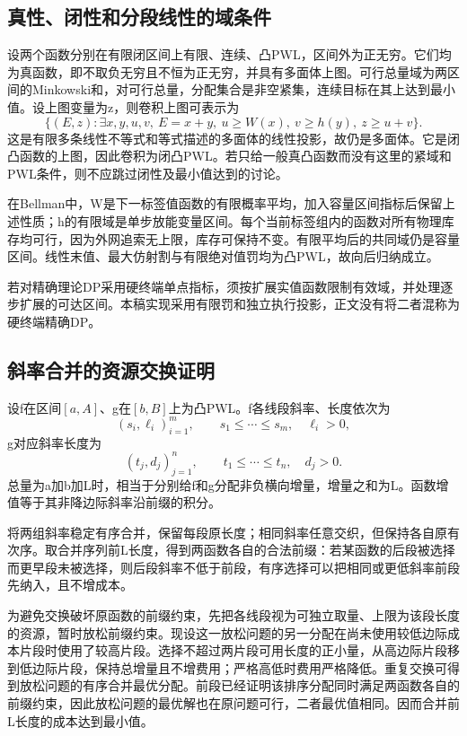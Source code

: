 \subsection{真性、闭性和分段线性的域条件}
设两个函数分别在有限闭区间上有限、连续、凸PWL，区间外为正无穷。它们均为真函数，即不取负无穷且不恒为正无穷，并具有多面体上图。可行总量域为两区间的Minkowski和，对可行总量，分配集合是非空紧集，连续目标在其上达到最小值。设上图变量为z，则卷积上图可表示为
\begin{equation}
 \{(E,z):\exists x,y,u,v,\ E=x+y,\ u\ge W(x),\ v\ge h(y),\ z\ge u+v\}.
\end{equation}
这是有限多条线性不等式和等式描述的多面体的线性投影，故仍是多面体。它是闭凸函数的上图，因此卷积为闭凸PWL。若只给一般真凸函数而没有这里的紧域和PWL条件，则不应跳过闭性及最小值达到的讨论。

在Bellman中，W是下一标签值函数的有限概率平均，加入容量区间指标后保留上述性质；h的有限域是单步放能变量区间。每个当前标签组内的函数对所有物理库存均可行，因为外网追索无上限，库存可保持不变。有限平均后的共同域仍是容量区间。线性末值、最大仿射割与有限绝对值罚均为凸PWL，故向后归纳成立。

若对精确理论DP采用硬终端单点指标，须按扩展实值函数限制有效域，并处理逐步扩展的可达区间。本稿实现采用有限罚和独立执行投影，正文没有将二者混称为硬终端精确DP。

\subsection{斜率合并的资源交换证明}
设f在区间$[a,A]$、g在$[b,B]$上为凸PWL。f各线段斜率、长度依次为
\begin{equation}
 (s_i,\ell_i)_{i=1}^{m},\qquad s_1\le\cdots\le s_m,\quad \ell_i>0,
\end{equation}
g对应斜率长度为
\begin{equation}
 (t_j,d_j)_{j=1}^{n},\qquad t_1\le\cdots\le t_n,\quad d_j>0.
\end{equation}
总量为a加b加L时，相当于分别给f和g分配非负横向增量，增量之和为L。函数增值等于其非降边际斜率沿前缀的积分。

将两组斜率稳定有序合并，保留每段原长度；相同斜率任意交织，但保持各自原有次序。取合并序列前L长度，得到两函数各自的合法前缀：若某函数的后段被选择而更早段未被选择，则后段斜率不低于前段，有序选择可以把相同或更低斜率前段先纳入，且不增成本。

为避免交换破坏原函数的前缀约束，先把各线段视为可独立取量、上限为该段长度的资源，暂时放松前缀约束。现设这一放松问题的另一分配在尚未使用较低边际成本片段时使用了较高片段。选择不超过两片段可用长度的正小量，从高边际片段移到低边际片段，保持总增量且不增费用；严格高低时费用严格降低。重复交换可得到放松问题的有序合并最优分配。前段已经证明该排序分配同时满足两函数各自的前缀约束，因此放松问题的最优解也在原问题可行，二者最优值相同。因而合并前L长度的成本达到最小值。


